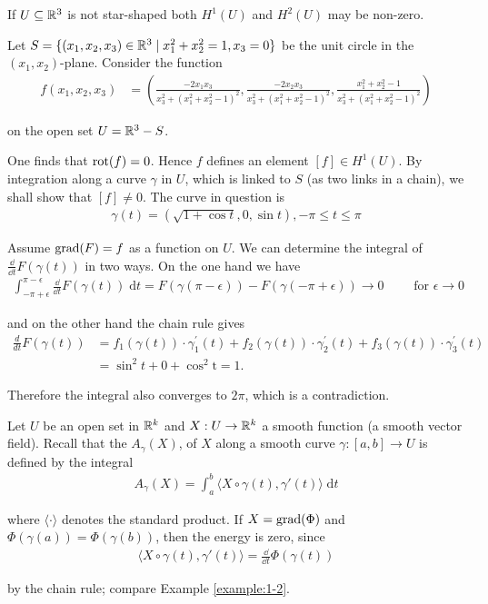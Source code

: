 If $U\subseteq{\ensuremath{\mathbb{R}}}^3$ is not star-shaped both $H^1(U)$ and $H^2(U)$ may be non-zero.

\begin{example}\label{example:1-7}
  Let $S = \{(x_1, x_2, x_3)\in {\ensuremath{\mathbb{R}}}^3\mid x_1^2 + x_2^2 = 1, x_3 = 0\}$ be the unit circle
in the $(x_1, x_2)$-plane. Consider the function
\begin{align*}
  f(x_1,x_2,x_3)
  & = \left(\frac{-2x_1x_3}{x_3^2+\left(x_1^2+x_2^2-1\right)^2},\frac{-2x_2x_3}{x_3^2+\left(x_1^2+x_2^2-1\right)^2},\frac{x_1^2+x_2^2-1}{x_3^2+\left(x_1^2+x_2^2-1\right)^2}\right)
\end{align*}

on the open set $U = {\mathbb{R}}^3 - S$.
\end{example}

One finds that $\operatorname{rot}(f) = 0$. Hence $f$ defines an element $[f] \in H^1(U)$. By
integration along a curve $\gamma$ in $U$, which is linked to $S$ (as two links in a chain),
we shall show that $[f] \neq 0$. The curve in question is
\begin{align*}
  \gamma(t) = \left(\sqrt{1+\cos t}, 0, \sin t\right), -\pi\le t\le \pi
\end{align*}

Assume $\operatorname{grad}(F) = f$ as a function on $U$. We can determine the integral of 
$\frac{\dd }{\dd t}F(\gamma(t))$ in two ways. On the one hand we have
\begin{align*}
  \int_{-\pi+\epsilon}^{\pi-\epsilon}{\frac{\dd }{\dd t}F(\gamma(t)) \;\mathrm{d}t}
  = F(\gamma(\pi-\epsilon)) - F(\gamma(-\pi+\epsilon))
  \to 0\qquad \text{ for } \epsilon\to 0
\end{align*}

and on the other hand the chain rule gives
\begin{align*}
  \frac{d}{dt}F(\gamma(t))
  & = f_{1}(\gamma(t)) \cdot\gamma_{1}^{\prime}(t)+f_{2}(\gamma(t))\cdot\gamma_{2}^{\prime}(t)+f_{3}(\gamma(t))\cdot \gamma_{3}^{\prime}(t) \\
  & = \sin^{2}t+0+\cos^{2}\mathrm{t}=1.
\end{align*}

Therefore the integral also converges to $2\pi$, which is a contradiction.

\begin{example}\label{example:1-8}
  Let $U$ be an open set in ${\mathbb{R}}^k$ and $X: U\to {\ensuremath{\mathbb{R}}}^k$ a smooth function (a smooth vector field). 
Recall that the  $A_\gamma(X)$, of $X$ along a smooth curve $\gamma: [a, b]\to U$ is 
defined by the integral
\begin{align*}
  A_\gamma(X) = \int_{a}^{b}{\langle X\circ \gamma(t), \gamma'(t)\rangle\;\mathrm{d}t}
\end{align*}

where $\langle\cdot\rangle$ denotes the standard product. If $X = \operatorname{grad}(\Phi)$ and $\Phi(\gamma(a)) = \Phi(\gamma(b))$,
then the energy is zero, since 
\begin{align*}
  \langle X\circ \gamma(t), \gamma'(t)\rangle = \frac{\dd }{\dd t}\Phi(\gamma(t))
\end{align*}

by the chain rule; compare Example \ref{example:1-2}.
\end{example}
